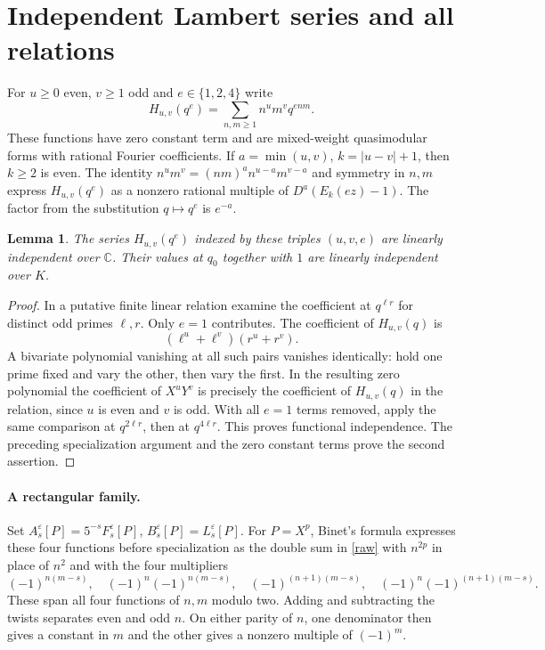 \documentclass[11pt]{article}
\newtheorem{lemma}[theorem]{Lemma}
\newcommand{\CC}{\mathbb C}
\begin{document}
\clearpage
\section{Independent Lambert series and all relations}\label{linearproof}
For $u\ge0$ even, $v\ge1$ odd and $e\in\{1,2,4\}$ write
\[
 H_{u,v}(q^e)=\sum_{n,m\ge1}n^u m^v q^{enm}.
\]
These functions have zero constant term and are mixed-weight quasimodular forms with rational Fourier coefficients. If $a=\min(u,v)$, $k=|u-v|+1$, then $k\ge2$ is even. The identity $n^um^v=(nm)^a n^{u-a}m^{v-a}$ and symmetry in $n,m$ express $H_{u,v}(q^e)$ as a nonzero rational multiple of $D^a(E_k(ez)-1)$. The factor from the substitution $q\mapsto q^e$ is $e^{-a}$.

\begin{lemma}\label{prime}
The series $H_{u,v}(q^e)$ indexed by these triples $(u,v,e)$ are linearly independent over $\CC$. Their values at $q_0$ together with $1$ are linearly independent over $K$.
\end{lemma}
\begin{proof}
In a putative finite linear relation examine the coefficient at $q^{\ell r}$ for distinct odd primes $\ell,r$. Only $e=1$ contributes. The coefficient of $H_{u,v}(q)$ is
\[
 (\ell^u+\ell^v)(r^u+r^v).
\]
A bivariate polynomial vanishing at all such pairs vanishes identically: hold one prime fixed and vary the other, then vary the first. In the resulting zero polynomial the coefficient of $X^uY^v$ is precisely the coefficient of $H_{u,v}(q)$ in the relation, since $u$ is even and $v$ is odd. With all $e=1$ terms removed, apply the same comparison at $q^{2\ell r}$, then at $q^{4\ell r}$. This proves functional independence. The preceding specialization argument and the zero constant terms prove the second assertion.
\end{proof}

\paragraph{A rectangular family.}
Set $A_s^\varepsilon[P]=5^{-s}F_s^\varepsilon[P]$, $B_s^\varepsilon[P]=L_s^\varepsilon[P]$. For $P=X^p$, Binet's formula expresses these four functions before specialization as the double sum in \eqref{raw} with $n^{2p}$ in place of $n^2$ and with the four multipliers
\[
 (-1)^{n(m-s)},\quad (-1)^n(-1)^{n(m-s)},\quad
 (-1)^{(n+1)(m-s)},\quad (-1)^n(-1)^{(n+1)(m-s)} .
\]
These span all four functions of $n,m$ modulo two. Adding and subtracting the twists separates even and odd $n$. On either parity of $n$, one denominator then gives a constant in $m$ and the other gives a nonzero multiple of $(-1)^m$.
\end{document}

